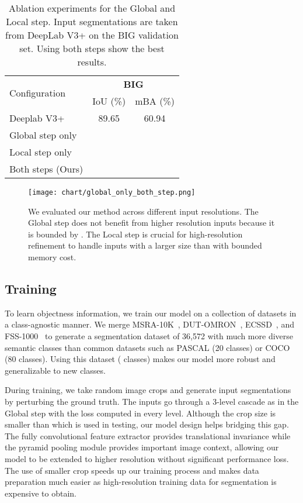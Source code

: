 \documentclass[10pt,twocolumn,letterpaper]{article}
\begin{document}
\vspace{-0.20in}
\begin{table}[ht]
\centering
\begin{tabular}{l|c|c}
  \multirow{2}{*}{Configuration} & \multicolumn{2}{c}{\textbf{BIG}}\\
  & IoU (\%) & mBA (\%)\\
  \hhline{|=|=|=|}
  Deeplab V3+ & 89.65 & 60.94 \\
  \hline
  Global step only &  &  \\
  Local step only &  &  \\
  Both steps (Ours) &  &  \\
\end{tabular}
\caption{Ablation experiments for the Global and Local step. Input segmentations are taken from DeepLab V3+ on the BIG validation set. Using both steps show the best results.}
\label{tab:ablation_global_local}
\vspace{-0.15in}
\end{table}


\begin{figure}[t]
\begin{center}
    \texttt{[image: chart/global\_only\_both\_step.png]}
\end{center}
    \vspace{-0.15in}
    \caption{
	We evaluated our method across different input resolutions. The Global step does not benefit from higher resolution inputs because it is bounded by . The Local step is crucial for high-resolution refinement to handle inputs with a larger size than  with bounded memory cost.
	}
	\label{fig:global_only_and_both_steps}
	\vspace{-0.15in}
\end{figure}


\subsection{Training}
To learn objectness information, we train our model on a collection of datasets in a class-agnostic manner. We merge MSRA-10K~\cite{ChengPAMI}, DUT-OMRON~\cite{yang2013saliency}, ECSSD~\cite{shi2015hierarchical}, and FSS-1000~\cite{FSS1000} to generate a segmentation dataset of 36,572 with much more diverse semantic classes than common datasets such as PASCAL (20 classes) or COCO (80 classes).
Using this dataset ( classes) makes our model more robust and generalizable to new classes.

During training, we take random  image crops and generate input segmentations by perturbing the ground truth. The inputs go through a 3-level cascade as in the Global step with the loss computed in every level. 
Although the crop size is smaller than  which is used in testing, our model design helps bridging this gap. The fully convolutional feature extractor provides translational invariance while the pyramid pooling module provides important image context, allowing our model to be extended to higher resolution without significant performance loss. The use of smaller crop speeds up our training process and makes data preparation much easier as high-resolution training data for segmentation is expensive to obtain.
\end{document}

